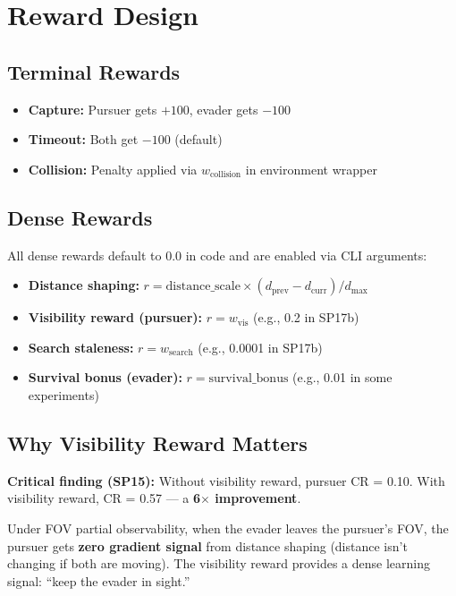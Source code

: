 \documentclass[11pt,a4paper]{report}
\begin{document}
\section{Reward Design}

\subsection{Terminal Rewards}
\begin{itemize}
    \item \textbf{Capture:} Pursuer gets $+100$, evader gets $-100$
    \item \textbf{Timeout:} Both get $-100$ (default)
    \item \textbf{Collision:} Penalty applied via $w_{\text{collision}}$ in environment wrapper
\end{itemize}

\subsection{Dense Rewards}
All dense rewards default to 0.0 in code and are enabled via CLI arguments:
\begin{itemize}
    \item \textbf{Distance shaping:} $r = \text{distance\_scale} \times (d_{\text{prev}} - d_{\text{curr}}) / d_{\text{max}}$
    \item \textbf{Visibility reward (pursuer):} $r = w_{\text{vis}}$ (e.g., 0.2 in SP17b)
    \item \textbf{Search staleness:} $r = w_{\text{search}}$ (e.g., 0.0001 in SP17b)
    \item \textbf{Survival bonus (evader):} $r = \text{survival\_bonus}$ (e.g., 0.01 in some experiments)
\end{itemize}

\subsection{Why Visibility Reward Matters}

\begin{warningbox}
\textbf{Critical finding (SP15):} Without visibility reward, pursuer CR = 0.10. With visibility reward, CR = 0.57 --- a \textbf{6$\times$ improvement}.

Under FOV partial observability, when the evader leaves the pursuer's FOV, the pursuer gets \textbf{zero gradient signal} from distance shaping (distance isn't changing if both are moving). The visibility reward provides a dense learning signal: ``keep the evader in sight.''
\end{warningbox}
\end{document}
